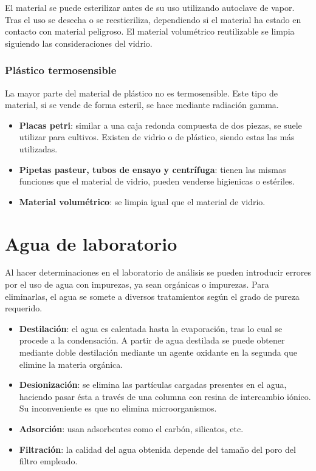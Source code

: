 El material se puede esterilizar antes de su uso utilizando autoclave de vapor. Tras el uso se desecha o se reestieriliza, dependiendo si el material ha estado en contacto con material peligroso. El material volumétrico reutilizable se limpia siguiendo las consideraciones del vidrio.
\subsubsection{Plástico termosensible}
La mayor parte del material de plástico no es termosensible. Este tipo de material, si se vende de forma esteril, se hace mediante radiación gamma.
\begin{itemize}[itemsep=0pt,parsep=0pt,topsep=0pt,partopsep=0pt]
    \item \textbf{Placas petri}: similar a una caja redonda compuesta de dos piezas, se suele utilizar para cultivos. Existen de vidrio o de plástico, siendo estas las más utilizadas.
    \item\textbf{Pipetas pasteur, tubos de ensayo y centrífuga}: tienen las mismas funciones que el material de vidrio, pueden venderse higienicas o estériles.
    \item\textbf{Material volumétrico}: se limpia igual que el material de vidrio.
\end{itemize}
\section{Agua de laboratorio}
Al hacer determinaciones en el laboratorio de análisis se pueden introducir errores por el uso de agua con impurezas, ya sean orgánicas o impurezas. Para eliminarlas, el agua se somete a diversos tratamientos según el grado de pureza requerido.
\begin{itemize}[itemsep=0pt,parsep=0pt,topsep=0pt,partopsep=0pt]
    \item \textbf{Destilación}: el agua es calentada hasta la evaporación, tras lo cual se procede a la condensación. A partir de agua destilada se puede obtener mediante doble destilación mediante un agente oxidante en la segunda que elimine la materia orgánica.
    \item\textbf{Desionización}: se elimina las partículas cargadas presentes en el agua, haciendo pasar ésta a través de una columna con resina de intercambio iónico. Su inconveniente es que no elimina microorganismos.
    \item\textbf{Adsorción}: usan adsorbentes como el carbón, silicatos, etc.
    \item\textbf{Filtración}: la calidad del agua obtenida depende del tamaño del poro del filtro empleado.
\end{itemize}
